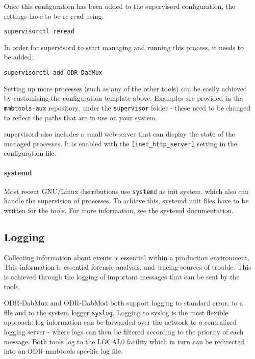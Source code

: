 Once this configuration has been added to the supervisord configuration, the
settings have to be re-read using:
\begin{lstlisting}
supervisorctl reread
\end{lstlisting}

In order for supervisord to start managing and running this process, it needs to
be added:

\begin{lstlisting}
supervisorctl add ODR-DabMux
\end{lstlisting}

Setting up more processes (such as any of the other tools) can be easily
achieved by customising the configuration template above. Examples are provided
in the \texttt{mmbtools-aux} repository, under the \texttt{supervisor} folder -
these need to be changed to reflect the paths that are in use on your system.

supervisord also includes a small web-server that can display the state of the
managed processes. It is enabled with the \verb+[inet_http_server]+ setting in
the configuration file.

\paragraph{systemd}
Most recent GNU/Linux distributions use \texttt{systemd} as init system, which
also can handle the supervision of processes. To achieve this, systemd unit
files have to be written for the tools. For more information, see the systemd
documentation.


\subsection{Logging}
Collecting information about events is essential within a production environment.
This information is essential forensic analysis, and tracing sources of trouble.
This is achieved through the logging of important messages that can be sent by
the tools.

ODR-DabMux and ODR-DabMod both support logging to standard error, to a file and
to the system logger \texttt{syslog}. Logging to syslog is the most flexible
approach; log information can be forwarded over the network to a
centralised logging server - where logs can then be filtered according to the
priority of each message. Both tools log to the LOCAL0 facility which in turn
can be redirected into an ODR-mmbtools specific log file.

